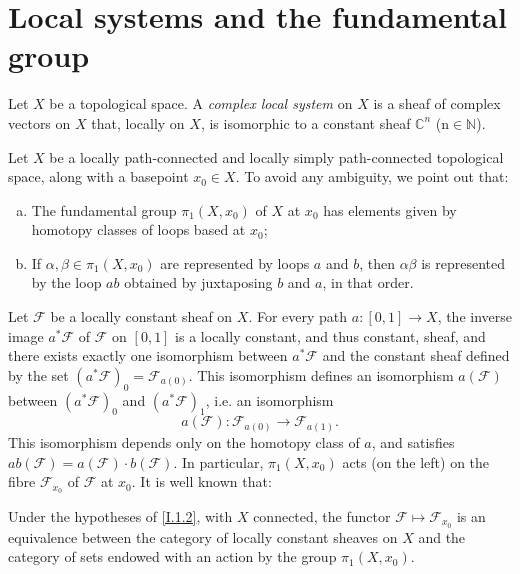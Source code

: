 \documentclass{report}
\theoremstyle{plain}
\newenvironment{proposition}[1]
    {\renewcommand\theinnercustomproposition{#1}\innercustomproposition}
    {\endinnercustomproposition}
\theoremstyle{definition}
\newenvironment{definition}[1]
    {\renewcommand\theinnercustomdefinition{#1}\innercustomdefinition}
    {\endinnercustomdefinition}
\newenvironment{env}[1]
    {\renewcommand\theinnercustomenv{#1}\innercustomenv}
    {\endinnercustomenv}
\newcommand{\sh}{\mathscr}
\begin{document}
\section{Local systems and the fundamental group}
\label{I.1}

\begin{definition}{1.1}
\label{I.1.1}
  Let $X$ be a topological space.
  A \emph{complex local system} on $X$ is a sheaf of complex vectors on $X$ that, locally on $X$, is isomorphic to a constant sheaf $\mathbb{C}^n$ (n$\in\mathbb{N}$).
\end{definition}

\begin{env}{1.2}
\label{I.1.2}
  Let $X$ be a locally path-connected and locally simply path-connected topological space, along with a basepoint $x_0\in X$.
  To avoid any ambiguity, we point out that:
  \begin{enumerate}[a)]
    \item The fundamental group $\pi_1(X,x_0)$ of $X$ at $x_0$ has elements given by homotopy classes of loops based at $x_0$;
    \item If $\alpha,\beta\in\pi_1(X,x_0)$ are represented by loops $a$ and $b$, then $\alpha\beta$ is represented by the loop $ab$ obtained by juxtaposing $b$ and $a$, in that order.
  \end{enumerate}

  Let $\sh{F}$ be a locally constant sheaf on $X$.
  For every path $a\colon[0,1]\to X$, the inverse image $a^*\sh{F}$ of $\sh{F}$ on $[0,1]$ is a locally constant, and thus constant, sheaf, and there exists exactly one isomorphism between $a^*\sh{F}$ and the constant sheaf defined by the set $(a^*\sh{F})_0 = \sh{F}_{a(0)}$.
  This isomorphism defines an isomorphism $a(\sh{F})$ between $(a^*\sh{F})_0$ and $(a^*\sh{F})_1$, i.e. an isomorphism
  \[
    a(\sh{F})\colon \sh{F}_{a(0)} \to \sh{F}_{a(1)}.
  \]
  This isomorphism depends only on the homotopy class of $a$, and satisfies $ab(\sh{F}) = a(\sh{F})\cdot b(\sh{F})$.
  In particular, $\pi_1(X,x_0)$ acts (on the left) on the fibre $\sh{F}_{x_0}$ of $\sh{F}$ at $x_0$.
  It is well known that:
\end{env}

\begin{proposition}{1.3}
\label{I.1.3}
  Under the hypotheses of \cref{I.1.2}, with $X$ connected, the functor $\sh{F}\mapsto\sh{F}_{x_0}$ is an equivalence between the category of locally constant sheaves on $X$ and the category of sets endowed with an action by the group $\pi_1(X,x_0)$.
\end{proposition}
\end{document}
